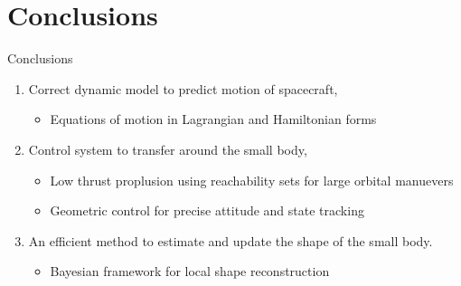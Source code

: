 \section{Conclusions}

\begin{frame}{Conclusions}
    \begin{enumerate}
        \item Correct dynamic model to predict motion of spacecraft,
            \pause
            \begin{alertblock}{}
                \begin{itemize}
                    \item Equations of motion in Lagrangian and Hamiltonian forms
                \end{itemize}
            \end{alertblock}
            \pause
        \item Control system to transfer around the small body,
            \pause
            \begin{alertblock}{}
                \begin{itemize}
                    \item Low thrust proplusion using reachability sets for large orbital manuevers
                    \item Geometric control for precise attitude and state tracking
                \end{itemize}
            \end{alertblock}
            \pause
        \item An efficient method to estimate and update the shape of the small body.
            \begin{alertblock}{}
                \begin{itemize}
                    \item Bayesian framework for local shape reconstruction
                \end{itemize}
            \end{alertblock}
    \end{enumerate}
\end{frame}

